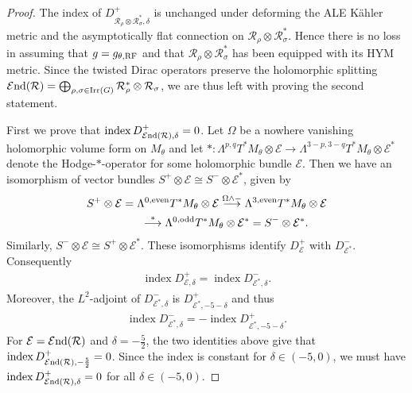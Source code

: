 \documentclass[10pt,a4paper]{amsart}
\numberwithin{equation}{section}
\newcommand{\cE}{\mathcal{E}}
\newcommand{\cR}{\mathcal{R}}
\newcommand{\Irr}{\operatorname{Irr}}
\newcommand{\cEnd}{\cE{\rm nd}}
\newcommand{\ind}{\mathop{\mathrm{index}}}
\newcommand{\iso}{\cong}
\newcommand{\RF}{{\rm RF}}
\begin{document}
\begin{proof}
  The index of $D^{+}_{\cR_{\rho}\otimes \cR_{\sigma}^*, \delta}$ is
  unchanged under deforming the ALE K\"ahler metric and the
  asymptotically f\/lat connection on $\cR_\rho\otimes\cR_\sigma^*$.
  Hence there is no loss in assuming that $g=g_{\theta,\RF}$ and that
  $\cR_\rho\otimes\cR_\sigma^*$ has been equipped with its HYM metric.
  Since the twisted Dirac operators preserve the holomorphic splitting
  $\cEnd(\cR) = \bigoplus_{\rho,\sigma\in \Irr(G)}\cR_{\rho}^*\otimes
  \cR_{\sigma}$, we are thus left with proving the second statement.

  First we prove that $\ind D^+_{\cEnd(\cR),\delta}=0$.  Let $\Omega$
  be a nowhere vanishing holomorphic volume form on $M_\theta$ and let
  $*\colon \Lambda^{p,q} T^*M_\theta \otimes \cE \to \Lambda^{3-p,3-q}
  T^*M_\theta \otimes \cE^*$ denote the Hodge-$*$-operator for some
  holomorphic bundle $\cE$.  Then we have an isomorphism of vector
  bundles $S^{+} \otimes \cE \iso S^{-} \otimes \cE^*$, given by
  \begin{gather*}
    S^+\otimes \cE=\Lambda^{0,\text{even}} T^*M_\theta\otimes \cE
    \stackrel{\Omega\wedge -}{\longrightarrow} \Lambda^{3,{\rm even}}
    T^*M_\theta \otimes \cE \\
\hphantom{S^+\otimes \cE}{}
    \stackrel{*}{\longrightarrow}
    \Lambda^{0,{\rm odd}} T^*M_\theta \otimes \cE^* = S^-\otimes
    \cE^*.
  \end{gather*}
  Similarly, $S^-\otimes \cE \iso S^+\otimes \cE^*$.  These
  isomorphisms identify $D^+_\cE$ with $D^-_{\cE^*}$.  Consequently
  \begin{gather*}%
    \ind D^+_{\cE,\delta}
    =\ind D^-_{\cE^*,\delta}.
  \end{gather*}
  Moreover, the $L^2$-adjoint of $D^{-}_{\cE^*, \delta}$ is
  $D^{+}_{\cE^*,-5-\delta}$ and thus
 \begin{gather*}%
   \ind D^{-}_{\cE^*,\delta} = - \ind D^{+}_{\cE^*, -5-\delta}.
 \end{gather*}
 For $\cE = \cEnd(\cR)$ and $\delta=-\frac52$, the two identities
 above give that $\ind D^+_{\cEnd(\cR),-\frac{5}{2}}=0$.  Since the
 index is constant for $\delta \in (-5, 0)$, we must have $\ind
 D^+_{\cEnd(\cR),\delta}=0$ for all $\delta \in (-5, 0)$.


\end{proof}
\end{document}
